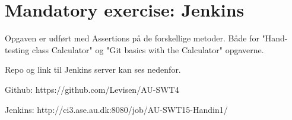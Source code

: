 \section{Mandatory exercise: Jenkins}

Opgaven er udført med Assertions på de forskellige metoder. 
Både for "Hand-testing class Calculator" og "Git basics with the Calculator" opgaverne.

Repo og link til Jenkins server kan ses nedenfor.

Github: https://github.com/Levisen/AU-SWT4

Jenkins: http://ci3.ase.au.dk:8080/job/AU-SWT15-Handin1/